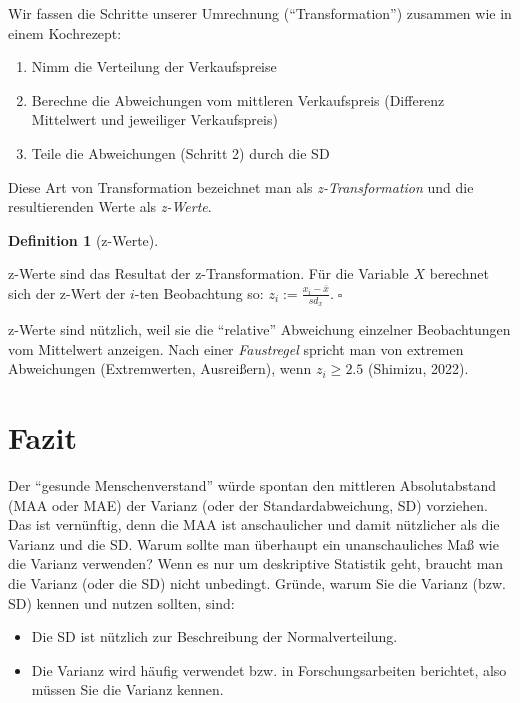 \documentclass[
  letterpaper,
  twoside,
  open=any]{scrbook}
\providecommand{\tightlist}{%
  \setlength{\itemsep}{0pt}\setlength{\parskip}{0pt}}\usepackage{longtable,booktabs,array}
\theoremstyle{definition}
\theoremstyle{definition}
\theoremstyle{definition}
\newtheorem{definition}{Definition}[chapter]
\theoremstyle{remark}
\begin{document}
Wir fassen die Schritte unserer Umrechnung (\enquote{Transformation})
zusammen wie in einem Kochrezept:

\begin{enumerate}
\def\labelenumi{\arabic{enumi}.}
\tightlist
\item
  Nimm die Verteilung der Verkaufspreise
\item
  Berechne die Abweichungen vom mittleren Verkaufspreis (Differenz
  Mittelwert und jeweiliger Verkaufspreis)
\item
  Teile die Abweichungen (Schritt 2) durch die SD
\end{enumerate}

Diese Art von Transformation bezeichnet man als \emph{z-Transformation}
und die resultierenden Werte als \emph{z-Werte}.

\begin{definition}[z-Werte]\protect\hypertarget{def-z-werte}{}\label{def-z-werte}

z-Werte sind das Resultat der z-Transformation. Für die Variable \(X\)
berechnet sich der z-Wert der \(i\)-ten Beobachtung so:
\(z_i := \frac{x_i - \bar{x}}{sd_x}.\;\square\)

\end{definition}

z-Werte sind nützlich, weil sie die \enquote{relative} Abweichung
einzelner Beobachtungen vom Mittelwert anzeigen. Nach einer
\emph{Faustregel} spricht man von extremen Abweichungen (Extremwerten,
Ausreißern), wenn \(z_i \ge 2.5\) (Shimizu, 2022).

\section{Fazit}\label{fazit-2}

Der \enquote{gesunde Menschenverstand} würde spontan den mittleren
Absolutabstand (MAA oder MAE) der Varianz (oder der Standardabweichung,
SD) vorziehen. Das ist vernünftig, denn die MAA ist anschaulicher und
damit nützlicher als die Varianz und die SD. Warum sollte man überhaupt
ein unanschauliches Maß wie die Varianz verwenden? Wenn es nur um
deskriptive Statistik geht, braucht man die Varianz (oder die SD) nicht
unbedingt. Gründe, warum Sie die Varianz (bzw. SD) kennen und nutzen
sollten, sind:

\begin{itemize}
\tightlist
\item
  Die SD ist nützlich zur Beschreibung der Normalverteilung.
\item
  Die Varianz wird häufig verwendet bzw. in Forschungsarbeiten
  berichtet, also müssen Sie die Varianz kennen.
\end{itemize}
\end{document}
